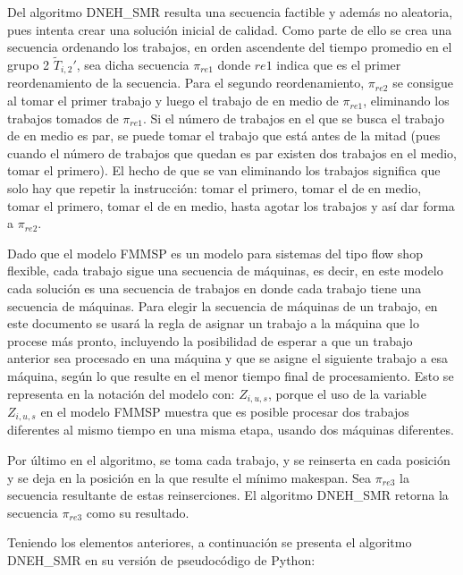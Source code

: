 \documentclass{article}
\begin{document}
\vspace{\baselineskip}
Del algoritmo DNEH\_SMR resulta una secuencia factible y además no aleatoria, pues intenta crear una solución inicial de calidad. Como parte de ello se crea una secuencia ordenando los trabajos, en orden ascendente del tiempo promedio en el grupo 2 $\widetilde{T}_{i,2}'$, sea dicha secuencia $\pi_{re1}$ donde $re1$ indica que es el primer reordenamiento de la secuencia. Para el segundo reordenamiento, $\pi_{re2}$ se consigue al tomar el primer trabajo y luego el trabajo de en medio de $\pi_{re1}$, eliminando los trabajos tomados de $\pi_{re1}$. Si el número de trabajos en el que se busca el trabajo de en medio es par, se puede tomar el trabajo que está antes de la mitad (pues cuando el número de trabajos que quedan es par existen dos trabajos en el medio, tomar el primero). El hecho de que se van eliminando los trabajos significa que solo hay que repetir la instrucción: tomar el primero, tomar el de en medio, tomar el primero, tomar el de en medio, hasta agotar los trabajos y así dar forma a $\pi_{re2}$. \autocite{algMNIG}

Dado que el modelo FMMSP es un modelo para sistemas del tipo flow shop flexible, cada trabajo sigue una secuencia de máquinas, es decir, en este modelo cada solución es una secuencia de trabajos en donde cada trabajo tiene una secuencia de máquinas. Para elegir la secuencia de máquinas de un trabajo, en este documento se usará la regla de asignar un trabajo a la máquina que lo procese más pronto, incluyendo la posibilidad de esperar a que un trabajo anterior sea procesado en una máquina y que se asigne el siguiente trabajo a esa máquina, según lo que resulte en el menor tiempo final de procesamiento. Esto se representa en la notación del modelo con: $Z_{i, u, s}$, porque el uso de la variable $Z_{i, u, s}$ en el modelo FMMSP muestra que es posible procesar dos trabajos diferentes al mismo tiempo en una misma etapa, usando dos máquinas diferentes.

\vspace{\baselineskip}
Por último en el algoritmo, se toma cada trabajo, y se reinserta en cada posición y se deja en la posición en la que resulte el mínimo makespan. Sea $\pi_{re3}$ la secuencia resultante de estas reinserciones. El algoritmo DNEH\_SMR retorna la secuencia $\pi_{re3}$ como su resultado. \autocite{algMNIG}

\vspace{\baselineskip}
Teniendo los elementos anteriores, a continuación se presenta el algoritmo DNEH\_SMR en su versión de pseudocódigo de Python:
\end{document}
